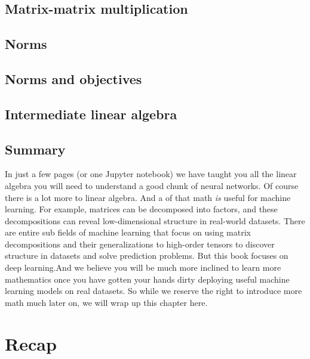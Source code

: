 \documentclass[]{article}
\begin{document}
\subsection{Matrix-matrix multiplication}

\subsection{Norms}

\subsection{Norms and objectives}

\subsection{Intermediate linear algebra}

\subsection{Summary}

In just a few pages (or one Jupyter notebook) we have taught you all the linear algebra you will need to understand a good chunk of neural networks. Of course there is a lot more to linear algebra. And a  of that math \textit{is} useful for machine learning. For example, matrices can be decomposed into factors, and these decompositions can reveal low-dimensional structure in real-world datasets. There are entire sub fields of machine learning that focus on using matrix decompositions and their generalizations to high-order tensors to discover structure in datasets and solve prediction problems. But this book focuses on deep learning.And we believe you will be much more inclined to learn more mathematics once you have gotten your hands dirty deploying useful machine learning models on real datasets. So while we reserve the right to introduce more math much later on, we will wrap up this chapter here.

\section{Recap}


\nocite{*}

\printbibliography
\end{document}
